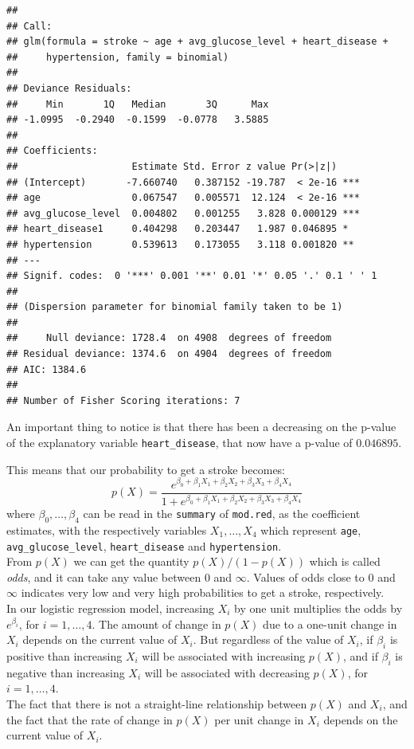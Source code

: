 \documentclass[
]{article}
\begin{document}
\begin{verbatim}
## 
## Call:
## glm(formula = stroke ~ age + avg_glucose_level + heart_disease + 
##     hypertension, family = binomial)
## 
## Deviance Residuals: 
##     Min       1Q   Median       3Q      Max  
## -1.0995  -0.2940  -0.1599  -0.0778   3.5885  
## 
## Coefficients:
##                    Estimate Std. Error z value Pr(>|z|)    
## (Intercept)       -7.660740   0.387152 -19.787  < 2e-16 ***
## age                0.067547   0.005571  12.124  < 2e-16 ***
## avg_glucose_level  0.004802   0.001255   3.828 0.000129 ***
## heart_disease1     0.404298   0.203447   1.987 0.046895 *  
## hypertension       0.539613   0.173055   3.118 0.001820 ** 
## ---
## Signif. codes:  0 '***' 0.001 '**' 0.01 '*' 0.05 '.' 0.1 ' ' 1
## 
## (Dispersion parameter for binomial family taken to be 1)
## 
##     Null deviance: 1728.4  on 4908  degrees of freedom
## Residual deviance: 1374.6  on 4904  degrees of freedom
## AIC: 1384.6
## 
## Number of Fisher Scoring iterations: 7
\end{verbatim}

An important thing to notice is that there has been a decreasing on the
p-value of the explanatory variable \texttt{heart\_disease}, that now
have a p-value of \(0.046895\).

This means that our probability to get a stroke becomes:
\[p(X)= \frac{e^{\beta_0+\beta_1X_1 + \beta_2X_2+\beta_3 X_3+\beta_4 X_4}}{1+e^{\beta_0+\beta_1X_1 + \beta_2X_2+\beta_3 X_3+\beta_4 X_4}}\]
where \(\beta_0, \dots, \beta_4\) can be read in the \texttt{summary} of
\texttt{mod.red}, as the coefficient estimates, with the respectively
variables \(X_1, \dots, X_4\) which represent \texttt{age},
\texttt{avg\_glucose\_level}, \texttt{heart\_disease} and
\texttt{hypertension}.\\
From \(p(X)\) we can get the quantity \(p(X)/(1-p(X))\) which is called
\emph{odds}, and it can take any value between \(0\) and \(\infty\).
Values of odds close to \(0\) and \(\infty\) indicates very low and very
high probabilities to get a stroke, respectively.\\
In our logistic regression model, increasing \(X_i\) by one unit
multiplies the odds by \(e^{\beta_i}\), for \(i=1, \dots, 4\). The
amount of change in \(p(X)\) due to a one-unit change in \(X_i\) depends
on the current value of \(X_i\). But regardless of the value of \(X_i\),
if \(\beta_i\) is positive than increasing \(X_i\) will be associated
with increasing \(p(X)\), and if \(\beta_i\) is negative than increasing
\(X_i\) will be associated with decreasing \(p(X)\), for
\(i=1, \dots, 4\).\\
The fact that there is not a straight-line relationship between \(p(X)\)
and \(X_i\), and the fact that the rate of change in \(p(X)\) per unit
change in \(X_i\) depends on the current value of \(X_i\).
\end{document}

